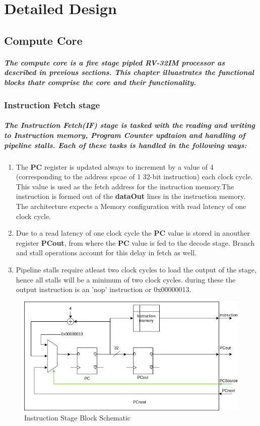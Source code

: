 \documentclass[12pt,a4paper]{report}
\begin{document}
\chapter{Detailed Design}
\section{Compute Core}
\paragraph{\textrm{\textmd{The compute core is a five stage pipled RV-32IM processor as described in previous sections. This chapter illuastrates the functional blocks thatr comprise the core and their functionality.}}}
\subsection{Instruction Fetch stage}
\paragraph{\textrm{\textmd{The Instruction Fetch(IF) stage is tasked with the reading and writing to Instruction memory, Program Counter updtaion and handling of pipeline stalls. Each of these tasks is handled in the following ways:}}}
\begin{enumerate}
	\item The \textbf{PC} register is updated always to increment by a value of 4 (corresponding to the address spcae of 1 32-bit instruction) each clock cycle. This value is used as the fetch address for the instruction memory.The instruction is formed out of the \textbf{dataOut} lines in the instruction memory. The architecture expects a Memory configuration with read latency of one clock cycle.
	\item Due to a read latency of one clock cycle the \textbf{PC} value is stored in anouther register \textbf{PCout}, from where the \textbf{PC} value is fed to the decode stage. Branch and stall operations account for this delay in fetch as well.
	\item Pipeline stalls require atleast two clock cycles to load the output of the stage, hence all stalls will be a minimum of two clock cycles. during these the output instruction is an 'nop' instruction or 0x00000013.
\end{enumerate}
\begin{figure}[h]
	\centering
	\includegraphics[scale=.45]{ifstage.png}
	\caption{Instruction Stage Block Schematic}
	\label{fig:ifstage}
\end{figure}
\end{document}
